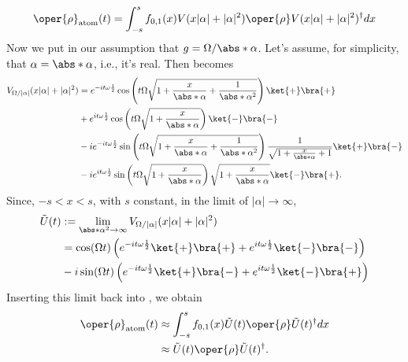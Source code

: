 \begin{equation}
    \label{eq:appen_JCM_rho_atom_t}
    \begin{aligned}
        \oper{\rho}_{\text{atom}}(t)= \int_{-s}^{s} f_{0,1}(x) V(x|\alpha| + |\alpha|^2) 
    \oper{\rho} V(x|\alpha| + |\alpha|^2)^{\dagger} dx
    \end{aligned}
\end{equation}
Now we put in our assumption that \(g = \Omega / \abs*{\alpha}\). Let's assume, 
for simplicity, that \(\alpha = \abs*{\alpha}\), i.e., it's real. Then  becomes
\begin{align}
    V_{\Omega/|\alpha|}(x|\alpha| + |\alpha|^2) 
    &= e^{-i t \omega \frac{1}{2}}\cos \left( t\Omega \sqrt{1 + \frac{x}{\abs*{\alpha}}+ \frac{1}{\abs*{\alpha}^2}} \right) \ket{+}\bra{+} \nonumber \\
    &+ e^{i t \omega \frac{1}{2} }\cos \left( t\Omega \sqrt{1 + \frac{x}{\abs*{\alpha}}} \right) \ket{-}\bra{-} \nonumber \\
    &- i e^{-i t \omega \frac{1}{2} }\sin \left( t\Omega \sqrt{1 + \frac{x}{\abs*{\alpha}} + \frac{1}{\abs*{\alpha}^2}} \right) \frac{1}{\sqrt{1 + \frac{x}{\abs*{\alpha}} + 1}} \ket{+}\bra{-} \nonumber \\
    &- i e^{i t \omega \frac{1}{2}} \sin \left( t\Omega \sqrt{1 + \frac{x}{\abs*{\alpha}}} \right) \sqrt{1 + \frac{x}{\abs*{\alpha}}} \ket{-}\bra{+}. \nonumber
\end{align}
Since, \(-s < x < s\), with \(s\) constant, in the limit of \(|\alpha| \to \infty\),
\begin{align}
        \label{eq:appen_JCM_V_g_limit}
    \tilde{U}(t) &:= \lim_{\abs*{\alpha}^2 \to \infty} 
    V_{\Omega/|\alpha|}(x|\alpha| + |\alpha|^2)  \nonumber \\
    &= \cos(\Omega t) \left(e^{-i t \omega \frac{1}{2}}\ket{+}\bra{+} + 
    e^{i t \omega \frac{1}{2}}\ket{-}\bra{-} \right)  \nonumber \\
    &- i \sin(\Omega t)
     \left( e^{-i t \omega \frac{1}{2}}\ket{+}\bra{-}
    + e^{i t \omega \frac{1}{2}}\ket{-}\bra{+}\right)  \nonumber \\
\end{align}
Inserting this limit back into , we obtain
\begin{align}
    \oper{\rho}_{\text{atom}}(t) &\approx \int_{-s}^{s} f_{0,1}(x) \tilde{U}(t) \oper{\rho} \tilde{U}(t)^{\dagger} dx \nonumber\\
        &\approx \tilde{U}(t) \oper{\rho} \tilde{U}(t)^{\dagger}.
\end{align}

